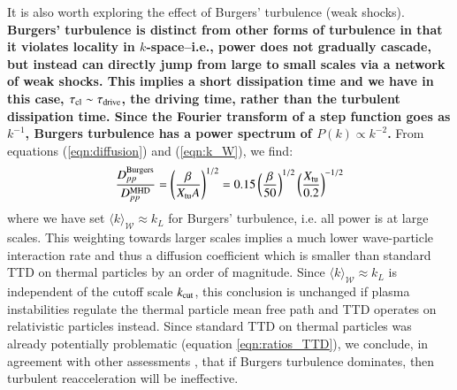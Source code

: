\documentclass[fleqn,usenatbib,useAMS]{mnras}
\newcommand\C[1]{{\bf #1}}
\begin{document}
It is also worth exploring the effect of Burgers' turbulence (weak shocks). \C{Burgers' turbulence is distinct from other forms of turbulence in that it violates locality in $k$-space--i.e., power does not gradually cascade, but instead can directly jump from large to small scales via a network of weak shocks. This implies a short dissipation time and we have in this case, $\tau_{\rm cl} \sim \tau_{\rm drive}$, the driving time, rather than the turbulent dissipation time. Since the Fourier transform of a step function goes as $k^{-1}$, Burgers turbulence has a power spectrum of $P(k) \propto k^{-2}$.} From equations (\ref{eqn:diffusion}) and (\ref{eqn:k_W}), we find: 
\begin{equation}
\frac{D_{pp}^{\rm Burgers}}{D_{pp}^{\rm MHD}} = \left( \frac{\beta}{X_{\rm tu} A} \right)^{1/2} = 0.15 \left( \frac{\beta}{50} \right)^{1/2} \left( \frac{X_{\rm tu}}{0.2} \right)^{-1/2} 
\end{equation}
where we have set $\langle k \rangle_{\mathcal{W}} \approx k_L$ for Burgers' turbulence, i.e. all power is at large scales. This weighting towards larger scales implies a much lower wave-particle interaction rate and thus a diffusion coefficient which is smaller than standard TTD on thermal particles by an order of magnitude. Since $\langle k \rangle_{\mathcal{W}} \approx k_L$ is independent of the cutoff scale $k_{\rm cut}$, this conclusion is unchanged if plasma instabilities regulate the thermal particle mean free path and TTD operates on relativistic particles instead. Since standard TTD on thermal particles was already potentially problematic (equation \ref{eqn:ratios_TTD}), we conclude, in agreement with other assessments \citep{miniati15,brunetti16_review}, that if Burgers turbulence dominates, then turbulent reacceleration will be ineffective.
\end{document}
